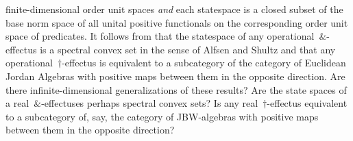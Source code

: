 \documentclass[b]{subfiles}
\begin{document}
\begin{parsec}
\begin{point}
\begin{point}
        finite-dimensional order unit spaces
        \emph{and} each statespace is a closed subset
        of the base norm space of all
        unital positive functionals on the corresponding
        order unit space of predicates.
It follows from \cite{wetering}
    that the statespace of any operational~$\&$-effectus
    is a spectral convex set in the sense of Alfsen and Shultz
    and that any operational~$\dagger$-effectus
    is equivalent to a subcategory of the category of Euclidean Jordan Algebras
    with positive maps between them in the opposite direction.
Are there infinite-dimensional generalizations of these results?
Are the state spaces of a real~$\&$-effectuses perhaps
    spectral convex sets?
Is any real~$\dagger$-effectus equivalent to a subcategory of, say,
    the category of JBW-algebras with positive maps between them
        in the opposite direction?
\end{point}
\end{point}
\end{parsec}
\end{document}
